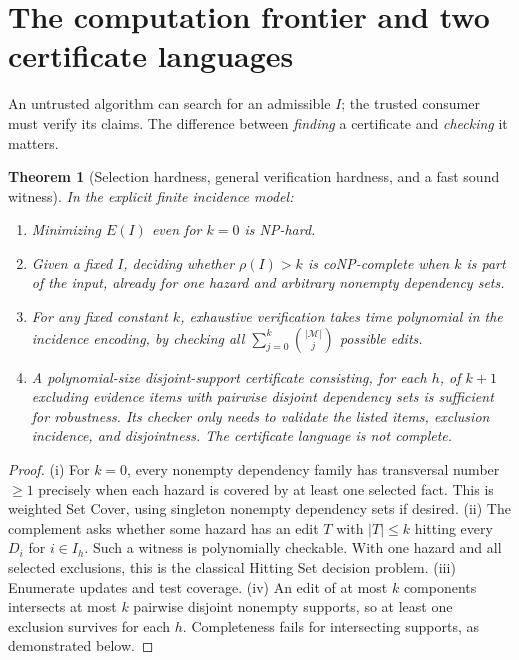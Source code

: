 \documentclass[11pt]{article}
\newtheorem{theorem}{Theorem}
\newcommand{\cm}{\mathcal M}\newcommand{\ch}{\mathcal H}\newcommand{\ci}{\mathcal I}
\begin{document}
\section{The computation frontier and two certificate languages}
An untrusted algorithm can search for an admissible $I$; the trusted consumer must verify its claims. The difference between \emph{finding} a certificate and \emph{checking} it matters.

\begin{theorem}[Selection hardness, general verification hardness, and a fast sound witness]\label{th:complexity}
In the explicit finite incidence model:
\begin{enumerate}[label=(\roman*),leftmargin=2em,itemsep=0.2em]
\item Minimizing $E(I)$ even for $k=0$ is NP-hard.
\item Given a fixed $I$, deciding whether $\rho(I)>k$ is coNP-complete when $k$ is part of the input, already for one hazard and arbitrary nonempty dependency sets.
\item For any fixed constant $k$, exhaustive verification takes time polynomial in the incidence encoding, by checking all $\sum_{j=0}^k\binom{|\cm|}{j}$ possible edits.
\item A polynomial-size \emph{disjoint-support certificate} consisting, for each $h$, of $k+1$ excluding evidence items with pairwise disjoint dependency sets is sufficient for robustness. Its checker only needs to validate the listed items, exclusion incidence, and disjointness. The certificate language is not complete.
\end{enumerate}
\end{theorem}
\begin{proof}
(i) For $k=0$, every nonempty dependency family has transversal number $\ge1$ precisely when each hazard is covered by at least one selected fact. This is weighted Set Cover, using singleton nonempty dependency sets if desired. (ii) The complement asks whether some hazard has an edit $T$ with $|T|\le k$ hitting every $D_i$ for $i\in I_h$. Such a witness is polynomially checkable. With one hazard and all selected exclusions, this is the classical Hitting Set decision problem. (iii) Enumerate updates and test coverage. (iv) An edit of at most $k$ components intersects at most $k$ pairwise disjoint nonempty supports, so at least one exclusion survives for each $h$. Completeness fails for intersecting supports, as demonstrated below.\end{proof}
\end{document}
